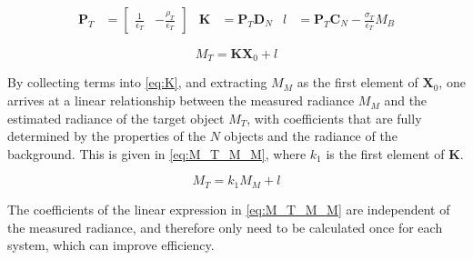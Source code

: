 \documentclass[11pt,a4paper]{article}
\begin{document}
\begin{align*}
\bm{P}_T &= \begin{bmatrix} \frac{1}{\epsilon_T} & - \frac{\rho_T}{\epsilon_T} \end{bmatrix} &
\bm{K} &= \bm{P}_T \bm{D}_N &
l &= \bm{P}_T \bm{C}_N - \frac{\sigma_T}{\epsilon_T} M_B
\end{align*}

\begin{equation}\label{eq:K}
	M_T = \bm{K} \bm{X}_0 + l
\end{equation}

By collecting terms into \cref{eq:K}, and extracting $ M_M $ as the first element of $ \bm{X}_0 $, one arrives at a linear relationship between the measured radiance $ M_M $ and the estimated radiance of the target object $ M_T $, with coefficients that are fully determined by the properties of the $ N $ objects and the radiance of the background. This is given in \cref{eq:M_T_M_M}, where $ k_{1} $ is the first element of $ \bm{K} $.

\begin{equation}\label{eq:M_T_M_M}
	M_T = k_{1} M_M + l
\end{equation}

The coefficients of the linear expression in \cref{eq:M_T_M_M} are independent of the measured radiance, and therefore only need to be calculated once for each system, which can improve efficiency.
\end{document}
